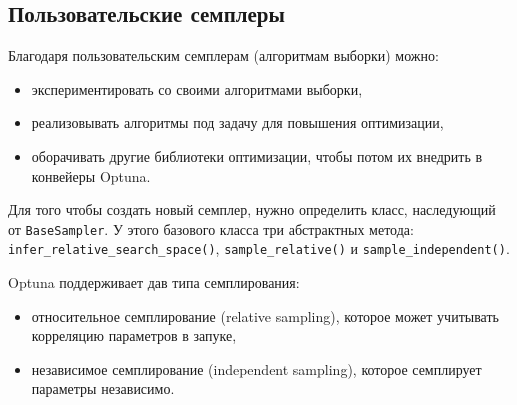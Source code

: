 \documentclass[%
	11pt,
	a4paper,
	utf8,
		]{article}
\begin{document}
\subsection{Пользовательские семплеры}

Благодаря пользовательским семплерам (алгоритмам выборки) можно:
\begin{itemize}
	\item экспериментировать со своими алгоритмами выборки,
	
	\item реализовывать алгоритмы под задачу для повышения оптимизации,
	
	\item оборачивать другие библиотеки оптимизации, чтобы потом их внедрить в конвейеры Optuna.
\end{itemize}

Для того чтобы создать новый семплер, нужно определить класс, наследующий от \verb|BaseSampler|. У этого базового класса три абстрактных метода: \verb|infer_relative_search_space()|, \verb|sample_relative()| и \verb|sample_independent()|.

Optuna поддерживает дав типа семплирования:
\begin{itemize}
	\item относительное семплирование (relative sampling), которое может учитывать корреляцию параметров в запуке,
	
	\item независимое семплирование (independent sampling), которое семплирует параметры независимо.
\end{itemize}
\end{document}
